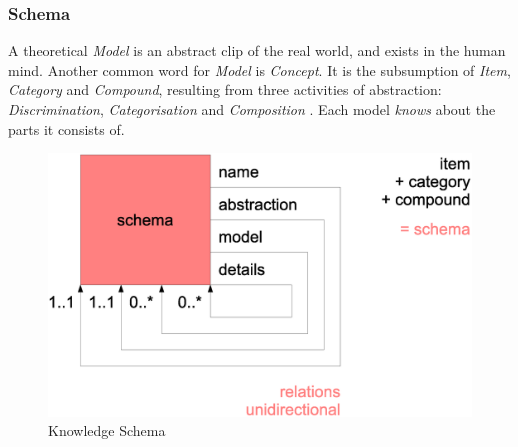 %
%
%
%
%
%
%

\subsubsection{Schema}
\label{schema_heading}

A theoretical \emph{Model} is an abstract clip of the real world, and exists in
the human mind. Another common word for \emph{Model} is \emph{Concept}. It is
the subsumption of \emph{Item}, \emph{Category} and \emph{Compound}, resulting
from three activities of abstraction: \emph{Discrimination},
\emph{Categorisation} and \emph{Composition} \cite{heller2004}. Each model
\emph{knows} about the parts it consists of.

\begin{figure}[ht]
    \begin{center}
        \includegraphics[scale=0.2]{vector/schema.eps}
        \caption{Knowledge Schema}
        \label{schema_figure}
    \end{center}
\end{figure}

